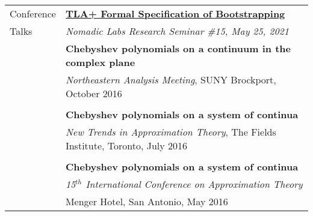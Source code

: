 \documentclass[letterpaper,10pt,oneside]{article}
\begin{document}
\vfill


\noindent \begin{tabular}{@{} l l}
 \Large{Conference} & \href{https://www.youtube.com/watch?v=WgO2hHt2GrQ}{\textbf{TLA+ Formal Specification of Bootstrapping}} \\
 \Large{Talks} & \emph{Nomadic Labs Research Seminar \#15, May 25, 2021} \\
 \hspace{1.1in} & \textbf{Chebyshev polynomials on a continuum in the complex plane}  \\
 & \emph{Northeastern Analysis Meeting}, SUNY Brockport, October 2016 \\
 & \\
 & \textbf{Chebyshev polynomials on a system of continua} \\
 & \emph{New Trends in Approximation Theory}, The Fields Institute, Toronto, July 2016 \\
 & \\
 & \textbf{Chebyshev polynomials on a system of continua} \\
 & \emph{15$^{th}$ International Conference on Approximation Theory} \\
 & Menger Hotel, San Antonio, May 2016 \\
\end{tabular}

\vfill

\end{document}
